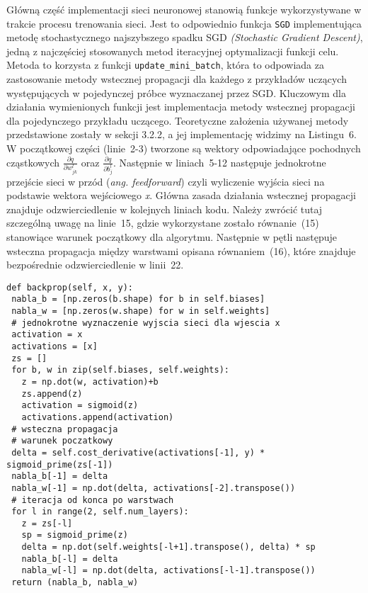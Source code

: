 \par Główną część implementacji sieci neuronowej stanowią funkcje wykorzystywane w trakcie procesu trenowania sieci. Jest to odpowiednio funkcja \texttt{SGD} implementująca metodę stochastycznego najszybszego spadku SGD \emph{(Stochastic Gradient Descent)}, jedną z najczęściej stosowanych metod iteracyjnej optymalizacji funkcji celu. Metoda to korzysta z funkcji \texttt{update{\_}mini{\_}batch}, która to odpowiada za zastosowanie metody wstecznej propagacji dla każdego z przykładów uczących występujących w pojedynczej próbce wyznaczanej przez SGD. Kluczowym dla działania wymienionych funkcji jest implementacja metody wstecznej propagacji dla pojedynczego przykładu uczącego. Teoretyczne założenia używanej metody przedstawione zostały w sekcji 3.2.2, a jej implementację widzimy na Listingu~6. W początkowej części (linie~2-3) tworzone są wektory odpowiadające pochodnych cząstkowych \( \frac{\partial q}{\partial w_{jk}^l} \) oraz \( \frac{\partial q}{\partial b_j^l} \). Następnie w liniach~5-12 następuje jednokrotne przejście sieci w przód (\emph{ang. feedforward}) czyli wyliczenie wyjścia sieci na podstawie wektora wejściowego \emph{x}. Główna zasada działania wstecznej propagacji znajduje odzwierciedlenie w kolejnych liniach kodu. Należy zwrócić tutaj szczególną uwagę na linie~15, gdzie wykorzystane zostało równanie~(15) stanowiące warunek początkowy dla algorytmu. Następnie w pętli następuje wsteczna propagacja między warstwami opisana równaniem~(16), które znajduje bezpośrednie odzwierciedlenie w linii~22.

\begin{listing}[!htb]
\begin{verbatim}
def backprop(self, x, y):
 nabla_b = [np.zeros(b.shape) for b in self.biases]
 nabla_w = [np.zeros(w.shape) for w in self.weights]
 # jednokrotne wyznaczenie wyjscia sieci dla wjescia x
 activation = x
 activations = [x] 
 zs = []
 for b, w in zip(self.biases, self.weights):
   z = np.dot(w, activation)+b
   zs.append(z)
   activation = sigmoid(z)
   activations.append(activation)
 # wsteczna propagacja
 # warunek poczatkowy
 delta = self.cost_derivative(activations[-1], y) * sigmoid_prime(zs[-1])
 nabla_b[-1] = delta
 nabla_w[-1] = np.dot(delta, activations[-2].transpose())
 # iteracja od konca po warstwach
 for l in range(2, self.num_layers):
   z = zs[-l]
   sp = sigmoid_prime(z)
   delta = np.dot(self.weights[-l+1].transpose(), delta) * sp
   nabla_b[-l] = delta
   nabla_w[-l] = np.dot(delta, activations[-l-1].transpose())
 return (nabla_b, nabla_w)
\end{verbatim}
\end{listing}

